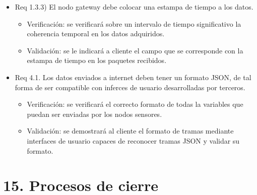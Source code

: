 \documentclass[
11pt, %
codirector, %
]{charter}
\begin{document}
\begin{itemize}
\item Req 1.3.3) El nodo gateway debe colocar una estampa de tiempo a los datos.

\begin{itemize}
	\item Verificación: se verificará sobre un intervalo de tiempo significativo la coherencia temporal en los datos adquiridos.
	\item Validación: se le indicará a cliente el campo que se corresponde con la estampa de tiempo en los paquetes recibidos.
\end{itemize}

\item Req 4.1. Los datos enviados a internet deben tener un formato JSON, de  tal forma de ser compatible con inferces de usuario desarrolladas por terceros.

\begin{itemize}
	\item Verificación: se verificará el correcto formato de todas la variables que puedan ser enviadas por los nodos sensores.
	\item Validación: se demostrará al cliente el formato de tramas mediante interfaces de usuario capaces de reconocer tramas JSON y validar su formato.
\end{itemize}

\end{itemize}

\section{15. Procesos de cierre}    
\label{sec:cierre}
\end{document}
